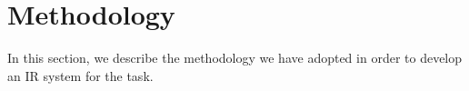 \section{Methodology}
\label{sec:methodology}

In this section, we describe the methodology we have adopted in order to develop an \ac{IR} system for the task.


\newpage

\newpage

\newpage

